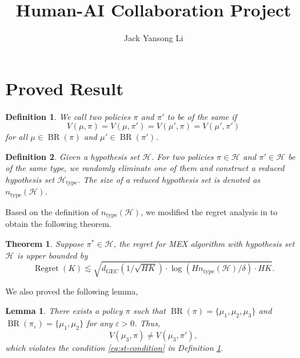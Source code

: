 \documentclass{article}
\newcommand{\tmop}[1]{\ensuremath{\operatorname{#1}}}
\newcommand{\tmtextit}[1]{\text{{\itshape{#1}}}}
\newtheorem{definition}{Definition}
\newtheorem{lemma}{Lemma}
{\theorembodyfont{\rmfamily}\newtheorem{question}{Question}}
{\theorembodyfont{\rmfamily}\newtheorem{remark}{Remark}}
\newtheorem{theorem}{Theorem}
\begin{document}
\title{Human-AI Collaboration Project}

\author{Jack Yansong Li}

\maketitle

\section{Proved Result}

\begin{definition}
  \label{def:strong-type}We call two policies $\pi$ and $\pi'$ to be of the
  same \tmtextit{type} if
  \[ V (\mu, \pi) = V (\mu, \pi') = V (\mu', \pi) = V (\mu', \pi')
     \label{eq:st-condition} \]
  for all $\mu \in \tmop{BR} (\pi)$ and $\mu' \in \tmop{BR} (\pi')$. 
\end{definition}

\begin{definition}
  \label{def:size-type}Given a hypothesis set $\mathcal{H}$. For two policies
  $\pi \in \mathcal{H}$ and $\pi' \in \mathcal{H}$ be of the same type, we
  randomly eliminate one of them and construct a reduced hypothesis set
  $\mathcal{H}_{\tmop{type}}$. The size of a reduced hypothesis set is denoted
  as $n_{\tmop{type}} (\mathcal{H})$.
\end{definition}

Based on the definition of $n_{\tmop{type}} (\mathcal{H})$, we modified the
regret analysis in {\cite{liu_one_2023}} to obtain the following theorem.

\begin{theorem}
  \label{thm:regret-analysis}Suppose $\pi^{\ast} \in \mathcal{H}$, the regret
  for MEX algorithm with hypothesis set $\mathcal{H}$ is upper bounded by
  \[ \tmop{Regret} (K) \lesssim \sqrt{d_{\tmop{GEC}} \left( 1 / \sqrt{H K}
     \right) \cdot \log (H n_{\tmop{type}} (\mathcal{H}) / \delta) \cdot H K}
     . \]
\end{theorem}

We also proved the following lemma,

\begin{lemma}
  There exists a policy $\pi$ such that $\tmop{BR} (\pi) = \{ \mu_1, \mu_2,
  \mu_3 \}$ and $\tmop{BR} (\pi_{\varepsilon}) = \{ \mu_1, \mu_2 \}$ for any
  $\varepsilon > 0$. Thus,
  \[ V (\mu_3, \pi) \neq V (\mu_3, \pi'), \]
  which violates the condition \eqref{eq:st-condition} in Definition
  \ref{def:strong-type}.
\end{lemma}
\end{document}
